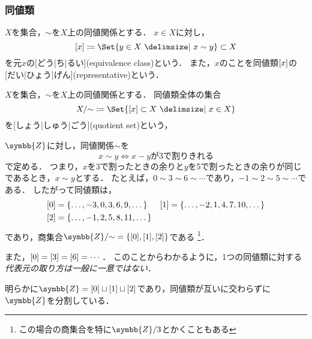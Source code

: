 \documentclass[../sotsu.tex]{subfiles}
\begin{document}
\subsubsection{同値類}

\begin{definition}[同値類]
    \label{dfn:equivalence-class}
    $X$を集合，$\sim$を$X$上の同値関係とする．
    $x \in X$に対し，
    \begin{equation}
        \eqclass{x}  \coloneq  \Set{ y \in X  \given  x \sim y } \subset X
    \end{equation}
    を元$x$の[どう|ち|るい](equivalence class)という．
    また，$x$のことを同値類$\lbrack x\rbrack$の[だい|ひょう|げん](representative)という．
\end{definition}

\begin{definition}[商集合]
    $X$を集合，$\sim$を$X$上の同値関係とする．
    同値類全体の集合
    \begin{equation}
        X/{\sim} \coloneq \Set{ \eqclass{x} \subset X  \given  x \in X }
    \end{equation}
    を[しょう|しゅう|ごう](quotient set)という，
\end{definition}


\begin{example}
    $\symbb{Z}$に対し，同値関係$\sim$を
    \begin{equation*}
        x \sim y  \iff  \text{$x-y$が$3$で割りきれる}
    \end{equation*}
    で定める．
    つまり，$x$を3で割ったときの余りと$y$を5で割ったときの余りが同じであるとき，$x \sim y$とする．
    たとえば，$0 \sim 3 \sim 6 \sim \dotsb$であり，$-1 \sim 2 \sim 5 \sim \dotsb$である．
    したがって同値類は，
    \begin{align*}
           \lbrack0\rbrack &= \{ \dotsc, -3, 0, 3, 6, 9, \dotsc \}
        &  \lbrack1\rbrack &= \{ \dotsc, -2, 1, 4, 7, 10, \dotsc \}
        \\ \lbrack2\rbrack &= \{ \dotsc, -1, 2, 5, 8, 11, \dotsc \}
    \end{align*}
    であり，商集合$\symbb{Z}/{\sim} = \{ \eqclass{0}, \eqclass{1}, \eqclass{2} \}$である
    \footnote{この場合の商集合を特に$\symbb{Z}/3$とかくこともある}．
    
    また，$\lbrack0\rbrack = \lbrack3\rbrack = \lbrack6\rbrack = \dotsb$．
    このことからわかるように，1つの同値類に対する\emph{代表元の取り方は一般に一意ではない}．

    明らかに$\symbb{Z} = \eqclass{0} \sqcup \eqclass{1} \sqcup \eqclass{2}$であり，同値類が互いに交わらずに$\symbb{Z}$を分割している．
\end{example}
\end{document}
